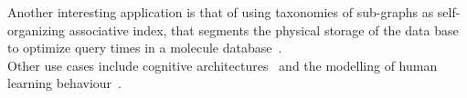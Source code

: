 Another interesting application is that of using taxonomies of sub-graphs as self-organizing associative index, that segments the physical storage of the data base to optimize query times in a molecule database~\cite{levinson1984self}. \\

\noindent Other use cases include cognitive architectures~\cite{langley1990integrated} and the modelling of human learning behaviour~\cite{maclellan2016trestle}. 


